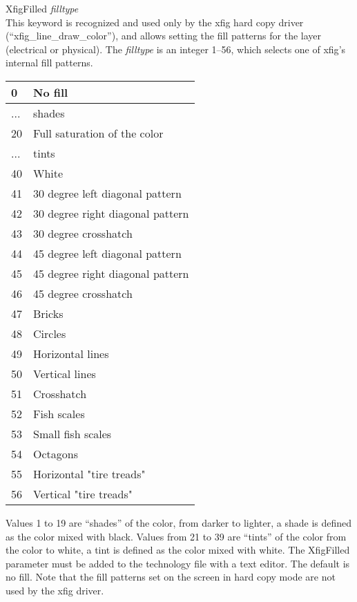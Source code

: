 \begin{description}
\item{\vt XfigFilled} {\it filltype}\\
This keyword is recognized and used only by the {\et xfig} hard copy
driver (``xfig\_line\_draw\_color''), and allows setting the fill
patterns for the layer (electrical or physical).  The {\it filltype}
is an integer 1--56, which selects one of {\et xfig}'s internal fill
patterns.

\begin{tabular}{|l|l|}\hline
0 & No fill\\ \hline
... & shades\\ \hline
20 & Full saturation of the color\\ \hline
... & tints\\ \hline
40 & White\\ \hline
41 & 30 degree left diagonal pattern\\ \hline
42 & 30 degree right diagonal pattern\\ \hline
43 & 30 degree crosshatch\\ \hline
44 & 45 degree left diagonal pattern\\ \hline
45 & 45 degree right diagonal pattern\\ \hline
46 & 45 degree crosshatch\\ \hline
47 & Bricks\\ \hline
48 & Circles\\ \hline
49 & Horizontal lines\\ \hline
50 & Vertical lines\\ \hline
51 & Crosshatch\\ \hline
52 & Fish scales\\ \hline
53 & Small fish scales\\ \hline
54 & Octagons\\ \hline
55 & Horizontal "tire treads"\\ \hline
56 & Vertical "tire treads"\\ \hline
\end{tabular}

Values 1 to 19 are ``shades'' of the color, from darker to lighter, a
shade is defined as the color mixed with black.  Values from 21 to 39
are ``tints'' of the color from the color to white, a tint is defined
as the color mixed with white.  The {\vt XfigFilled} parameter must be
added to the technology file with a text editor.  The default is no
fill.  Note that the fill patterns set on the screen in hard copy mode
are not used by the {\et xfig} driver.
\end{description}

